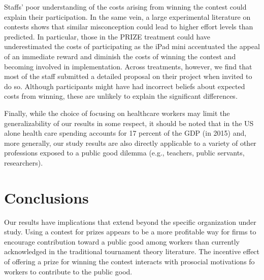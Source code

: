 \documentclass[12pt, titlepage]{article}
\begin{document}
Staffs' poor understanding of the costs arising from winning the contest
could explain their participation. In the same vein, a large
experimental literature on contests \citep{dechenaux2014survey} shows
that similar misconception could lead to higher effort levels than
predicted. In particular, those in the PRIZE treatment could have
underestimated the costs of participating as the iPad mini accentuated
the appeal of an immediate reward and diminish the costs of winning the
contest and becoming involved in implementation. Across treatments,
however, we find that most of the staff submitted a detailed proposal on
their project when invited to do so. Although participants might have
had incorrect beliefs about expected costs from winning, these are
unlikely to explain the significant differences.

Finally, while the choice of focusing on healthcare workers may limit
the generalizability of our results in some respect, it should be noted
that in the US alone health care spending accounts for 17 percent of the
GDP (in 2015) and, more generally, our study results are also directly
applicable to a variety of other professions exposed to a public good
dilemma (e.g., teachers, public servants, researchers).

\section{Conclusions}\label{conclusions}

Our results have implications that extend beyond the specific
organization under study. Using a contest for prizes appears to be a
more profitable way for firms to encourage contribution toward a public
good among workers than currently acknowledged in the traditional
tournament theory literature. The incentive effect of offering a prize
for winning the contest interacts with prosocial motivations fo workers
to contribute to the public good.

\renewcommand\refname{References}

\end{document}
